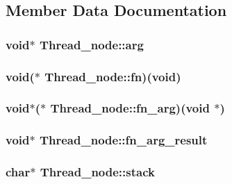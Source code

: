 \subsection{Member Data Documentation}
\hypertarget{structThread__node_aea9c75d845ef5ab44fba09356d192148}{
\subsubsection[{arg}]{\setlength{\rightskip}{0pt plus 5cm}void$\ast$ Thread\-\_\-node\-::arg}}\label{structThread__node_aea9c75d845ef5ab44fba09356d192148}
\hypertarget{structThread__node_a959c697a0166014fd7838fedf7f5c08e}{
\subsubsection[{fn}]{\setlength{\rightskip}{0pt plus 5cm}void($\ast$ Thread\-\_\-node\-::fn)(void)}}\label{structThread__node_a959c697a0166014fd7838fedf7f5c08e}
\hypertarget{structThread__node_ab154ce9419df7bced9fb62008f0d5db3}{
\subsubsection[{fn\-\_\-arg}]{\setlength{\rightskip}{0pt plus 5cm}void$\ast$($\ast$ Thread\-\_\-node\-::fn\-\_\-arg)(void $\ast$)}}\label{structThread__node_ab154ce9419df7bced9fb62008f0d5db3}
\hypertarget{structThread__node_a7decd53bf84dae7fb43b666395514158}{
\subsubsection[{fn\-\_\-arg\-\_\-result}]{\setlength{\rightskip}{0pt plus 5cm}void$\ast$ Thread\-\_\-node\-::fn\-\_\-arg\-\_\-result}}\label{structThread__node_a7decd53bf84dae7fb43b666395514158}
\hypertarget{structThread__node_ae1c95ac5f94f422f88c3001d97bc7339}{
\subsubsection[{stack}]{\setlength{\rightskip}{0pt plus 5cm}char$\ast$ Thread\-\_\-node\-::stack}}\label{structThread__node_ae1c95ac5f94f422f88c3001d97bc7339}

